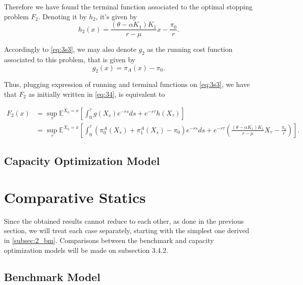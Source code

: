 Therefore we have found the terminal function associated to the optimal stopping problem $F_2$. Denoting it by $h_2$, it's given by
$$h_2(x)=\frac{(\theta-\alpha K_1)K_1}{r-\mu} x -\frac{\pi_0}{r}.$$

Accordingly to \eqref{eq:3s3}, we may also denote $g_2$ as the running cost function associated to this problem, that is given by
$$g_2(x)=\pi_A(x)-\pi_0.$$

Thus, plugging expression of running and terminal functions on \eqref{eq:3s3}, we have that $F_2$ as initially written in \eqref{eq:34}, is equivalent to

\begin{align}
F_2(x)&=\sup_{\tau} \mathds{E}^{X_0=x} \left[ \int_0^{\tau} g(X_s) e^{-rs}ds + e^{-r\tau}h(X_\tau)  \right]\\
&=\sup_{\tau} \mathds{E}^{X_0=x} \left[ \int_0^{\tau} \left( \pi_0^A(X_s)+\pi_1^A(X_s)-\pi_0 \right) e^{-rs}ds + e^{-r\tau} \left(   \frac{(\theta-\alpha K_1)K_1}{r-\mu} X_{\tau} -\frac{\pi_0}{r} \right)  \right].
\label{eq:3s10}
\end{align}


\subsection{Capacity Optimization Model}
\label{subsec:2_com}





\section{Comparative Statics}
Since the obtained results cannot reduce to each other, as done in the previous section, we will treat each case separately, starting with the simplest one derived in \ref{subsec:2_bm}.
Comparisons between the benchmark and capacity optimization models will be made on subsection 3.4.2.\\

\subsection{Benchmark Model}
